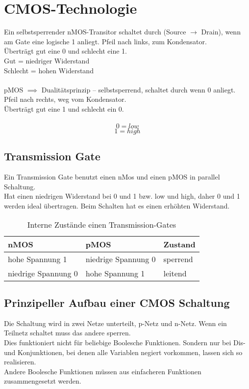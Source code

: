 \documentclass[a4paper]{scrartcl}
\begin{document}
	
		\section{CMOS-Technologie}
		Ein selbstsperrender nMOS-Transitor schaltet durch (Source \( \rightarrow \) Drain), wenn am Gate eine logische 1 anliegt. Pfeil nach links, zum Kondensator.\\
		Überträgt gut eine 0 und schlecht eine 1.\\
		Gut = niedriger Widerstand\\
		Schlecht = hohen Widerstand\\
		\\
		pMOS \( \implies \) Dualitätsprinzip -- selbstsperrend, schaltet durch wenn 0 anliegt. Pfeil nach rechts, weg vom Kondensator.\\
		Überträgt gut eine 1 und schlecht ein 0.\\
		\\
		\[0  = low \]
		\[1 = high \]
		
		\subsection{Transmission Gate}
		Ein Transmission Gate benutzt einen nMos und einen pMOS in parallel Schaltung.\\
		Hat einen niedrigen Widerstand bei 0 und 1 bzw. low und high, daher 0 und 1 werden ideal übertragen. Beim Schalten hat es einen erhöhten Widerstand. \\
		\begin{table}[H]
			\centering
			\begin{tabular}{l l | l}
				nMOS & pMOS & Zustand \\
				\hline
				hohe Spannung 1 & niedrige Spannung 0 & sperrend\\
				niedrige Spannung 0 & hohe Spannung 1 & leitend\\
			\end{tabular}
		\caption{Interne Zustände einen Transmission-Gates}
		\end{table}
		
		\subsection{Prinzipeller Aufbau einer CMOS Schaltung}
		Die Schaltung wird in zwei Netze unterteilt, p-Netz und n-Netz. Wenn ein Teilnetz schaltet muss das andere sperren. \\
		Dies funktioniert nicht für beliebige Boolesche Funktionen. Sondern nur bei Dis- und Konjunktionen, bei denen alle Variablen negiert vorkommen, lassen sich so realisieren.\\
		Andere Boolesche Funktionen müssen aus einfacheren Funktionen zusammengesetzt werden.\\
		
\end{document}
